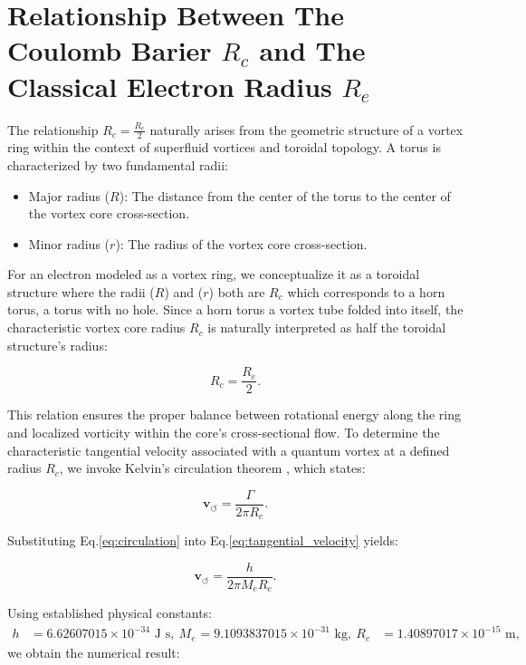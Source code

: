 \documentclass[a4paper,10pt]{article}
\begin{document}
\section{Relationship Between The Coulomb Barier $R_c$ and The Classical Electron Radius $R_e$ }
The relationship $R_c = \frac{R_e}{2}$ naturally arises from the geometric structure of a vortex ring within the context of superfluid vortices and toroidal topology. A torus is characterized by two fundamental radii:

\begin{itemize}
\item Major radius ($R$): The distance from the center of the torus to the center of the vortex core cross-section.
\item Minor radius ($r$): The radius of the vortex core cross-section.
\end{itemize}

For an electron modeled as a vortex ring, we conceptualize it as a toroidal structure where the radii ($R$) and ($r$) both are $R_c$ which corresponds to a horn torus, a torus with no hole. Since a horn torus a vortex tube folded into itself, the characteristic vortex core radius $R_c$ is naturally interpreted as half the toroidal structure's radius:

\begin{equation*}
R_c = \frac{R_e}{2}.
\end{equation*}

This relation ensures the proper balance between rotational energy along the ring and localized vorticity within the core's cross-sectional flow. To determine the characteristic tangential velocity associated with a quantum vortex at a defined radius  $ R_c $, we invoke Kelvin's circulation theorem \cite{donnelly_quantized_1991, tilley_superfluidity_1990}, which states:

\begin{equation*}
    \mathbf{v}_{\scriptscriptstyle\boldsymbol{\circlearrowleft}} = \frac{\Gamma}{2\pi R_c}.\label{eq:tangential_velocity}
\end{equation*}

Substituting Eq.\eqref{eq:circulation} into Eq.\eqref{eq:tangential_velocity} yields:

\begin{equation*}
    \mathbf{v}_{\scriptscriptstyle\boldsymbol{\circlearrowleft}} = \frac{h}{2\pi M_e R_c}.
    \label{eq:Ce_vorticity}
\end{equation*}

Using established physical constants:
\begin{align*}
h &= 6.62607015 \times 10^{-34} \text{ J s}, \
M_e &= 9.1093837015 \times 10^{-31} \text{ kg}, \
R_c &= 1.40897017 \times 10^{-15} \text{ m},
\end{align*}
we obtain the numerical result:
\end{document}
